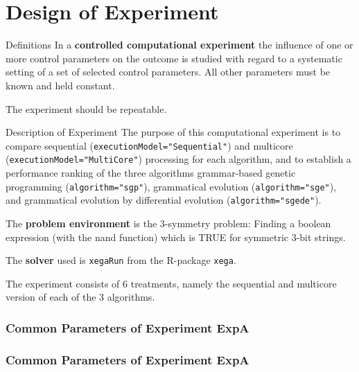 \documentclass[18pt,c]{beamer}
\begin{document}
\section{Design of Experiment}
\begin{frame}
\vspace*{2mm}
\begin{block}{
Definitions
}
In a {\bf controlled computational experiment} the influence
of one or more control parameters on the outcome is studied with
regard to a systematic setting of a set of selected control parameters.
All other parameters must be known and held constant.
 
The experiment should be repeatable.
\end{block}
\end{frame}%
\begin{frame}
\vspace*{2mm}
\begin{block}{
Description of Experiment
}
The purpose of this computational experiment is
to compare sequential ({\tt executionModel="Sequential"})
and multicore ({\tt executionModel="MultiCore"}) processing
for each algorithm,
and to establish a performance ranking of the three algorithms
grammar-based genetic programming ({\tt algorithm="sgp"}),
grammatical evolution ({\tt algorithm="sge"}), and
grammatical evolution by differential evolution ({\tt algorithm="sgede"}).
 
The {\bf problem environment} is the 3-symmetry problem:
Finding a boolean expression (with the nand function)
which is TRUE for symmetric 3-bit strings.
 
The {\bf solver} used is {\tt xegaRun} from the R-package {\tt xega}.
 
The experiment consists of 6 treatments, namely the sequential and
multicore version of each of the 3 algorithms.
\end{block}
\end{frame}%
 \begin{frame}
 \fontsize{8pt}{9pt}\selectfont
 \frametitle{ Common Parameters of Experiment ExpA }

 \label{ExpACommonTable000.tex}  
 \end{frame}

 \begin{frame}
 \fontsize{8pt}{9pt}\selectfont
 \frametitle{ Common Parameters of Experiment ExpA }

 \label{ExpACommonTable001.tex}  
 \end{frame}
\end{document}
